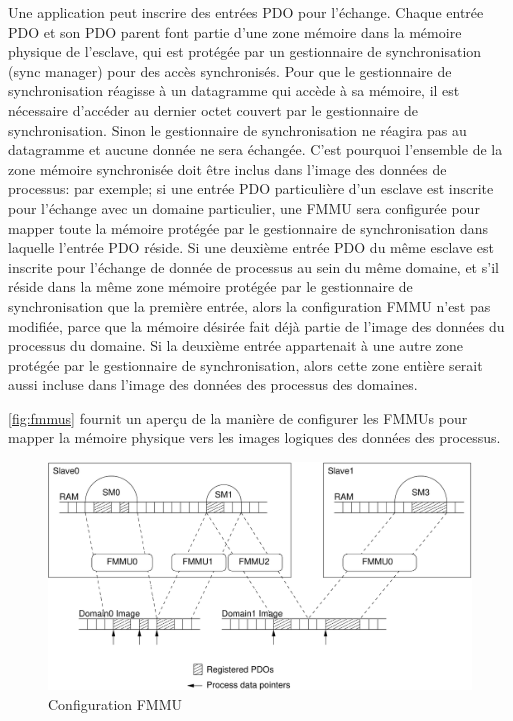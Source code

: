 \documentclass[a4paper,12pt,BCOR6mm,bibtotoc,idxtotoc]{scrbook}
\begin{document}
Une application peut inscrire des entr\'ees PDO pour l'\'echange.
Chaque entr\'ee PDO et son PDO parent font partie d'une zone m\'emoire
dans la m\'emoire physique de l'esclave, qui est prot\'eg\'ee par un
gestionnaire de synchronisation (sync manager) \cite[sec.~6.7]{dlspec}
pour des acc\`es synchronis\'es.  Pour que le gestionnaire de
synchronisation r\'eagisse \`a un datagramme qui acc\`ede \`a sa
m\'emoire, il est n\'ecessaire d'acc\'eder au dernier octet couvert
par le gestionnaire de synchronisation. Sinon le gestionnaire de
synchronisation ne r\'eagira pas au datagramme et aucune donn\'ee ne
sera \'echang\'ee.  C'est pourquoi l'ensemble de la zone m\'emoire
synchronis\'ee doit \^etre inclus dans l'image des donn\'ees de
processus: par exemple; si une entr\'ee PDO particuli\`ere d'un
esclave est inscrite pour l'\'echange avec un domaine particulier, une
FMMU sera configur\'ee pour mapper toute la m\'emoire prot\'eg\'ee par
le gestionnaire de synchronisation dans laquelle l'entr\'ee PDO
r\'eside. Si une deuxi\`eme entr\'ee PDO du m\^eme esclave est
inscrite pour l'\'echange de donn\'ee de processus au sein du m\^eme
domaine, et s'il r\'eside dans la m\^eme zone m\'emoire prot\'eg\'ee
par le gestionnaire de synchronisation que la premi\`ere entr\'ee,
alors la configuration FMMU n'est pas modifi\'ee, parce que la
m\'emoire d\'esir\'ee fait d\'ej\`a partie de l'image des donn\'ees du
processus du domaine. Si la deuxi\`eme entr\'ee appartenait \`a une
autre zone prot\'eg\'ee par le gestionnaire de synchronisation, alors
cette zone enti\`ere serait aussi incluse dans l'image des donn\'ees
des processus des domaines.

\autoref{fig:fmmus} fournit un aper\c{c}u de la mani\`ere de
configurer les FMMUs pour mapper la m\'emoire physique vers les images
logiques des donn\'ees des processus.

\begin{figure}[htbp]
  \centering
  \includegraphics[width=\textwidth]{images/fmmus}
  \caption{Configuration FMMU}
  \label{fig:fmmus}
\end{figure}
\end{document}
